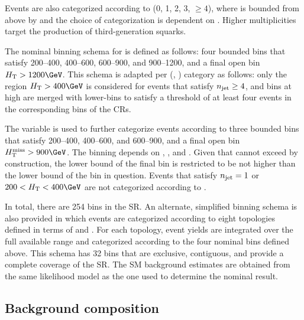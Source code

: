 Events are also categorized according to \nb (0, 1, 2, 3, ${\geq}4$),
where \nb is bounded from above by \njet and the choice of
categorization is dependent on \njet. Higher \nb multiplicities target
the production of third-generation squarks.

The nominal binning schema for \scalht is defined as follows: four
bounded bins that satisfy 200--400, 400--600, 600--900, and
900--1200\GeV, and a final open bin $\scalht > 1200\GeV$. This schema
is adapted per (\njet, \nb) category as follows: only the region
$\scalht > 400\GeV$ is considered for events that satisfy $n_{\text{jet}} \geq
4$, and bins at high \scalht are merged with lower-\scalht bins to
satisfy a threshold of at least four events in the corresponding bins
of the CRs.

The \mht variable is used to further categorize events according to
three bounded bins that satisfy 200--400, 400--600, and 600--900, and
a final open bin $\mht > 900\GeV$. The \mht binning depends on \njet,
\nb, and \scalht. Given that \mht cannot exceed \scalht by
construction, the lower bound of the final \mht bin is restricted to
be not higher than the lower bound of the \scalht bin in
question. Events that satisfy $n_{\text{jet}} = 1$ or $200 < \scalht < 400\GeV$
are not categorized according to \mht.

In total, there are 254 bins in the SR. An alternate, simplified
binning schema is also provided in which events are categorized
according to eight topologies defined in terms of \njet and \nb. For
each topology, event yields are integrated over the full available
\scalht range and categorized according to the four nominal \mht bins
defined above. This schema has 32 bins that are exclusive, contiguous,
and provide a complete coverage of the SR. The SM background estimates
are obtained from the same likelihood model as the one used to
determine the nominal result.

\subsection{Background composition}
\label{sec:bkgd}

